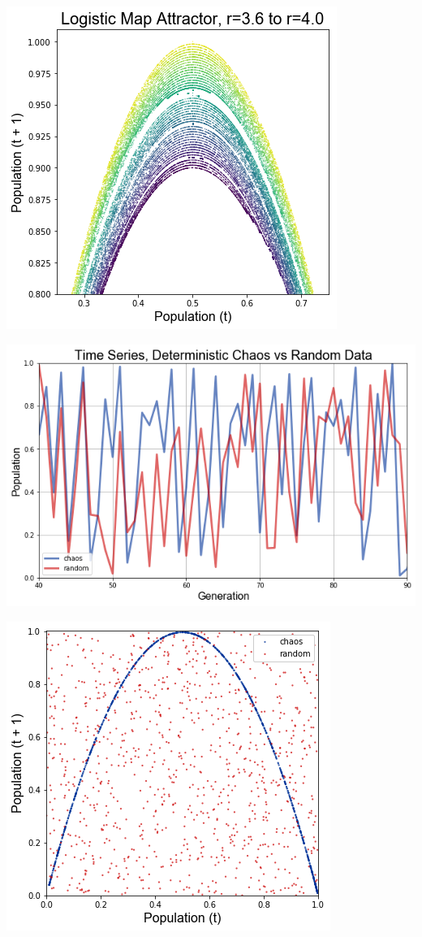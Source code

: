 \documentclass[a4paper,12pt]{article}
\begin{document}
\begin{center}
\includegraphics[scale=0.5]{10.png}
\end{center}
\begin{center}
\includegraphics[scale=0.5]{11.png}
\end{center}
\begin{center}
\includegraphics[scale=0.5]{12.png}
\end{center}
\end{document}
